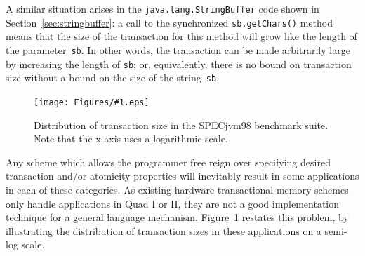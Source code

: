 \documentclass[12pt,oneside]{article}
\newcommand{\epsfigput}[2]{%
\begin{figure}[t]%
\begin{center}%
\texttt{[image: Figures/\#1.eps]}%
\end{center}%
\caption{#2}%
\label{fig:#1}%
\end{figure}%
}
\newcommand{\figref}[1]         {Figure~\ref{fig:#1}}
\newcommand{\secref}[1]         {Section~\ref{sec:#1}}
\begin{document}
A similar situation arises in the {\tt java.lang.StringBuffer} code
shown in \secref{stringbuffer}:  a call to the synchronized
\texttt{sb.getChars()} method means that
the size of the transaction for this method will grow like the length
of the parameter~\texttt{sb}.  In other words, the transaction can be
made arbitrarily large by increasing the length of \texttt{sb}; or,
equivalently, there is no bound on transaction size without a bound on
the size of the string~\texttt{sb}.

\epsfigput{tr-sz-all}{Distribution of transaction size in the
  SPECjvm98 benchmark suite.  Note that the x-axis uses a logarithmic
  scale.}

Any scheme which allows the programmer free reign over specifying
desired transaction and/or atomicity properties will inevitably result
in some applications in each of these categories.  As existing
hardware transactional memory schemes only handle applications in Quad
I or II, they are not a good implementation technique for a general
language mechanism.  \figref{tr-sz-all} restates this problem, by
illustrating the distribution of transaction sizes in these
applications on a semi-log scale.
\end{document}
